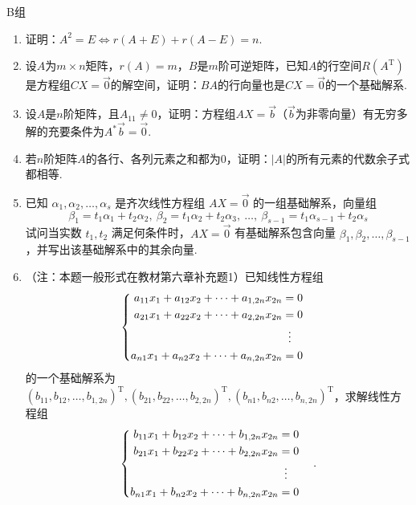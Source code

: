 \centerline{\heiti B组}
\begin{enumerate}
    \item 证明：$A^2=E \iff r(A+E)+r(A-E)=n$.

    \item 设$A$为$m \times n$矩阵，$r(A)=m$，$B$是$m$阶可逆矩阵，已知$A$的行空间$R(A^\mathrm{T})$是方程组$CX=\vec{0}$的解空间，证明：$BA$的行向量也是$CX=\vec{0}$的一个基础解系.

    \item 设$A$是$n$阶矩阵，且$A_{11}\neq 0$，证明：方程组$AX=\vec{b}$（$\vec{b}$为非零向量）有无穷多解的充要条件为$A^*\vec{b}=\vec{0}$.

    \item 若$n$阶矩阵$A$的各行、各列元素之和都为0，证明：$|A|$的所有元素的代数余子式都相等.

    \item 已知 $\alpha_1,\alpha_2,\ldots,\alpha_s$ 是齐次线性方程组 $AX=\vec{0}$ 的一组基础解系，向量组
          \[\beta_1=t_1\alpha_1+t_2\alpha_2,\ \beta_2=t_1\alpha_2+t_2\alpha_3,\ \ldots,\ \beta_{s-1}=t_1\alpha_{s-1}+t_2\alpha_s\]
          试问当实数 $t_1,t_2$ 满足何条件时，$AX=\vec{0}$ 有基础解系包含向量 $\beta_1,\beta_2,\ldots,\beta_{s-1}$，并写出该基础解系中的其余向量.

    \item （注：本题一般形式在教材第六章补充题1）已知线性方程组
          \[\begin{cases} \begin{aligned}
                      a_{11}x_1+a_{12}x_2+\cdots+a_{1,2n}x_{2n} & =0              \\
                      a_{21}x_1+a_{22}x_2+\cdots+a_{2,2n}x_{2n} & =0              \\
                                                                & \vdotswithin{=} \\
                      a_{n1}x_1+a_{n2}x_2+\cdots+a_{n,2n}x_{2n} & =0              \\
                  \end{aligned}\end{cases}\]
          的一个基础解系为$(b_{11},b_{12},\ldots,b_{1,2n})^\mathrm{T},(b_{21},b_{22},\ldots,b_{2,2n})^\mathrm{T},(b_{n1},b_{n2},\ldots,b_{n,2n})^\mathrm{T}$，求解线性方程组
          \[\begin{cases} \begin{aligned}
                      b_{11}x_1+b_{12}x_2+\cdots+b_{1,2n}x_{2n} & =0              \\
                      b_{21}x_1+b_{22}x_2+\cdots+b_{2,2n}x_{2n} & =0              \\
                                                                & \vdotswithin{=} \\
                      b_{n1}x_1+b_{n2}x_2+\cdots+b_{n,2n}x_{2n} & =0              \\
                  \end{aligned} \end{cases}.\]


\end{enumerate}
